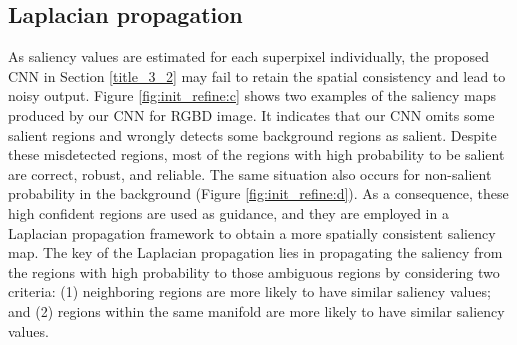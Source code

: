 \documentclass[journal]{IEEEtran}
\begin{document}
\subsection{Laplacian propagation}
As saliency values are estimated for each superpixel individually, the proposed CNN in Section \ref{title_3_2} may fail to retain the spatial consistency and lead to noisy output. Figure \ref{fig:init_refine:c} shows two examples of the saliency maps produced by our CNN for RGBD image. It indicates that our CNN omits some salient regions and wrongly detects some background regions as salient. Despite these misdetected regions, most of the regions with high probability to be salient are correct, robust, and reliable. The same situation also occurs for non-salient probability in the background (Figure \ref{fig:init_refine:d}). As a consequence, these high confident regions are used as guidance, and they are employed in a Laplacian propagation framework \cite{zhou2004learning} to obtain a more spatially consistent saliency map. The key of the Laplacian propagation lies in propagating the saliency from the regions with high probability to those ambiguous regions by considering two criteria:
(1) neighboring regions are more likely to have similar saliency values; and (2) regions within the same manifold are more likely to have similar saliency values.
\end{document}
